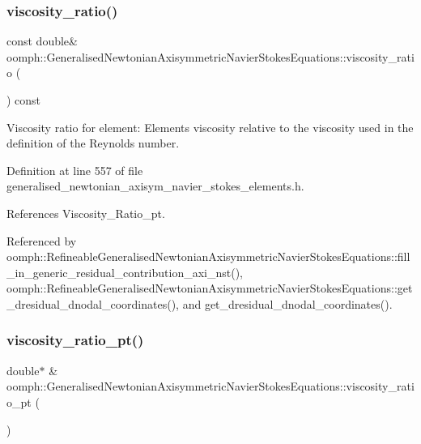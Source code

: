 \subsubsection{\texorpdfstring{viscosity\+\_\+ratio()}{viscosity\_ratio()}}
{\footnotesize\ttfamily const double\& oomph\+::\+Generalised\+Newtonian\+Axisymmetric\+Navier\+Stokes\+Equations\+::viscosity\+\_\+ratio (\begin{DoxyParamCaption}{ }\end{DoxyParamCaption}) const\hspace{0.3cm}{\ttfamily [inline]}}



Viscosity ratio for element\+: Element\textquotesingle{}s viscosity relative to the viscosity used in the definition of the Reynolds number. 



Definition at line 557 of file generalised\+\_\+newtonian\+\_\+axisym\+\_\+navier\+\_\+stokes\+\_\+elements.\+h.



References Viscosity\+\_\+\+Ratio\+\_\+pt.



Referenced by oomph\+::\+Refineable\+Generalised\+Newtonian\+Axisymmetric\+Navier\+Stokes\+Equations\+::fill\+\_\+in\+\_\+generic\+\_\+residual\+\_\+contribution\+\_\+axi\+\_\+nst(), oomph\+::\+Refineable\+Generalised\+Newtonian\+Axisymmetric\+Navier\+Stokes\+Equations\+::get\+\_\+dresidual\+\_\+dnodal\+\_\+coordinates(), and get\+\_\+dresidual\+\_\+dnodal\+\_\+coordinates().

\mbox{\label{classoomph_1_1GeneralisedNewtonianAxisymmetricNavierStokesEquations_aefe866ba2eea920b15e2f508c732f5d2}} 
\subsubsection{\texorpdfstring{viscosity\+\_\+ratio\+\_\+pt()}{viscosity\_ratio\_pt()}}
{\footnotesize\ttfamily double$\ast$ \& oomph\+::\+Generalised\+Newtonian\+Axisymmetric\+Navier\+Stokes\+Equations\+::viscosity\+\_\+ratio\+\_\+pt (\begin{DoxyParamCaption}{ }\end{DoxyParamCaption})\hspace{0.3cm}{\ttfamily [inline]}}




